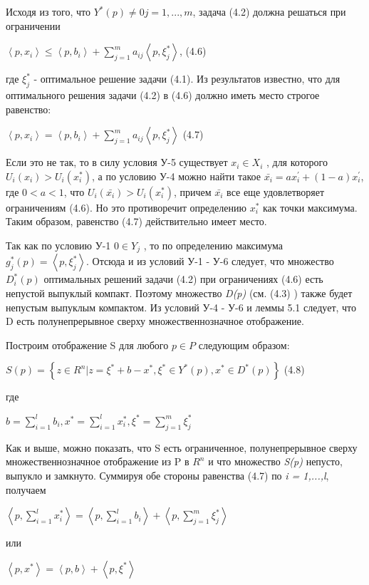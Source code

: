 \documentclass[12pt, 4paper]{book}
\begin{document}
{Исходя из того, что $Y^{*}(p) \neq 0 j=1,...,m$, задача (4.2) должна решаться при ограничении
\begin{center}
$\left\langle p,x_i \right\rangle \leq \left\langle p,b_i\right\rangle + \sum\limits_{j=1}^{m}a_{ij}\left\langle p,\xi_{j}^{*} \right\rangle$, (4.6)
\end{center}
где $\xi_{j}^{*}$ - оптимальное решение задачи (4.1). Из результатов известно, что для оптимального решения задачи (4.2) в (4.6) должно иметь место строгое равенство:
\begin{center}
$\left\langle p,x_i \right\rangle = \left\langle p,b_i \right\rangle + \sum\limits_{j=1}^{m}a_{ij} \left\langle  p,\xi_{j}^{*}\right\rangle$ (4.7)
\end{center}
Если это не так, то в силу условия У-5 существует $x_i \in X_i$ , для которого $U_i (x_i) > U_i(x_{i}^{*})$, а по условию У-4 можно найти такое $\bar{x_{i}}=a x_{i}^{'} + (1-a)x_{i}^{'}$, где $0 < a < 1$, что $U_i(\bar{x_i}) > U_i(x_{i}^{*})$, причем $\bar{x_{i}}$  все еще удовлетворяет ограничениям (4.6). Но это противоречит определению $x_{i}^{*}$ как точки максимума. Таким образом, равенство (4.7) действительно имеет место.
\par
 
Так как по условию У-1 $0 \in Y_j$ , то по определению максимума $g_{j}^{*}(p) = \left\langle p,\xi_{j}^{*} \right\rangle$. Отсюда и из условий У-1 - У-6 следует, что множество $D_{i}^{*}(p)$ оптимальных решений задачи (4.2) при ограничениях (4.6) есть непустой выпуклый компакт. Поэтому множество \textit{D(p)} (см. (4.3) ) также будет непустым выпуклым компактом. Из условий У-4 - У-6 и леммы 5.1 следует, что D есть полунепрерывное сверху множественнозначное отображение. 
\par
 
 Построим отображение S для любого $p \in P $ следующим образом:
\begin{center}
$S(p) = \left\{ z \in R^n | z=\xi^{*} + b - x^{*}, \xi^{*} \in Y^{*}(p),x^{*} \in D^{*}(p)\right\}$ (4.8)
\end{center}
где
\begin{center}
$b = \sum\limits_{i=1}^{l} b_i, x^{*}= \sum\limits_{i=1}^{l}x_{i}^{*}, \xi^{*} = \sum\limits_{j=1}^{m} \xi_{j}^{*}$
\end{center}
\par

Как и выше, можно показать, что S есть ограниченное, полунепрерывное сверху множественнозначное отображение из P в $R^n$ и что множество \textit{S(p)} непусто, выпукло и замкнуто. Суммируя обе стороны равенства (4.7) по \textit{i = 1,...,l}, получаем
\begin{center}
$\left\langle p,\sum\limits_{i=1}^{l}x_{i}^{*} \right\rangle = \left\langle p,\sum\limits_{i=1}^{l}b_i \right\rangle + \left\langle p,\sum\limits_{j=1}^{m} \xi_{j}^{*} \right\rangle$
\end{center}
или 
\begin{center}
$\left\langle  p,x^{*}\right\rangle = \left\langle p,b \right\rangle + \left\langle p,\xi^{*} \right\rangle$
\end{center}
\par

}
\end{document}
